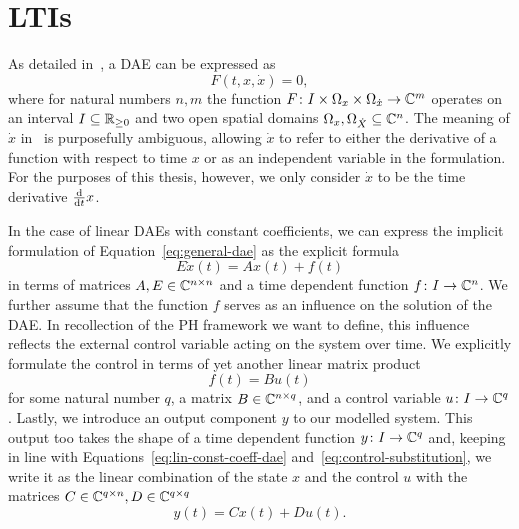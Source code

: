 \section{\aclp{LTI}}\label{sec:ltis}

As detailed in~\cite{Kunkel2006}, a \acf{DAE} can be expressed as
\begin{equation}\label{eq:general-dae}
    F(t, x, \dot{x}) = 0,
\end{equation}
where for natural numbers $n, m$ the function $F \colon I \times \Omega_x \times \Omega_{\dot{x}} \to \mathbb{C}^m$ operates on an interval $I \subseteq \mathbb{R}_{\ge 0}$ and two open spatial domains $\Omega_x, \Omega_{\dot{X}} \subseteq \mathbb{C}^n$.
The meaning of $\dot{x}$ in~\cite{Kunkel2006} is purposefully ambiguous, allowing $\dot{x}$ to refer to either the derivative of a function with respect to time $x$ or as an independent variable in the formulation.
For the purposes of this thesis, however, we only consider $\dot{x}$ to be the time derivative $\frac{\mathop{}\!\mathrm{d}}{\mathop{}\!\mathrm{d} t} x$.

In the case of linear \acp{DAE} with constant coefficients, we can express the implicit formulation of Equation~\eqref{eq:general-dae} as the explicit formula
\begin{equation}\label{eq:lin-const-coeff-dae}
    E \dot{x}(t) = A x(t) + f(t)
\end{equation}
in terms of matrices $A, E \in \mathbb{C}^{n \times n}$ and a time dependent function $f \colon I \to \mathbb{C}^n$.
We further assume that the function $f$ serves as an influence on the solution of the \ac{DAE}.
In recollection of the \ac{PH} framework we want to define, this influence reflects the external control variable acting on the system over time.
We explicitly formulate the control in terms of yet another linear matrix product
\begin{equation}\label{eq:control-substitution}
    f(t) = B u(t)
\end{equation}
for some natural number $q$, a matrix $B \in \mathbb{C}^{n \times q}$, and a control variable $u \colon I \to \mathbb{C}^q$.
Lastly, we introduce an output component $y$ to our modelled system.
This output too takes the shape of a time dependent function $y \colon I \to \mathbb{C}^q$ and, keeping in line with Equations~\eqref{eq:lin-const-coeff-dae} and~\eqref{eq:control-substitution}, we write it as the linear combination of the state $x$ and the control $u$ with the matrices $C \in \mathbb{C}^{q \times n}, D \in \mathbb{C}^{q \times q}$
\begin{equation}\label{eq:output-definition}
    y(t) = C x(t) + D u(t).
\end{equation}

